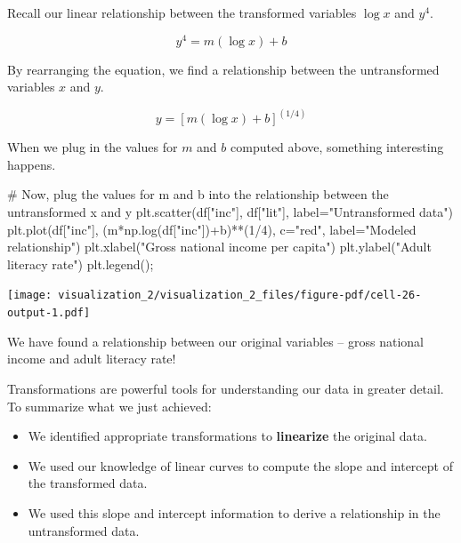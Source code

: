 \documentclass[
  letterpaper,
  DIV=11,
  numbers=noendperiod]{scrreprt}
\newenvironment{Shaded}{\begin{snugshade}}{\end{snugshade}}
\newcommand{\CommentTok}[1]{\textcolor[rgb]{0.37,0.37,0.37}{#1}}
\newcommand{\DecValTok}[1]{\textcolor[rgb]{0.68,0.00,0.00}{#1}}
\newcommand{\NormalTok}[1]{\textcolor[rgb]{0.00,0.23,0.31}{#1}}
\newcommand{\OperatorTok}[1]{\textcolor[rgb]{0.37,0.37,0.37}{#1}}
\newcommand{\StringTok}[1]{\textcolor[rgb]{0.13,0.47,0.30}{#1}}
\providecommand{\tightlist}{%
  \setlength{\itemsep}{0pt}\setlength{\parskip}{0pt}}\usepackage{longtable,booktabs,array}
\begin{document}
Recall our linear relationship between the transformed variables
\(\log{x}\) and \(y^4\).

\[y^4 = m(\log{x}) + b\]

By rearranging the equation, we find a relationship between the
untransformed variables \(x\) and \(y\).

\[y = [m(\log{x}) + b]^{(1/4)}\]

When we plug in the values for \(m\) and \(b\) computed above, something
interesting happens.

\begin{Shaded}
\begin{Highlighting}[]
\CommentTok{\# Now, plug the values for m and b into the relationship between the untransformed x and y}
\NormalTok{plt.scatter(df[}\StringTok{"inc"}\NormalTok{], df[}\StringTok{"lit"}\NormalTok{], label}\OperatorTok{=}\StringTok{"Untransformed data"}\NormalTok{)}
\NormalTok{plt.plot(df[}\StringTok{"inc"}\NormalTok{], (m}\OperatorTok{*}\NormalTok{np.log(df[}\StringTok{"inc"}\NormalTok{])}\OperatorTok{+}\NormalTok{b)}\OperatorTok{**}\NormalTok{(}\DecValTok{1}\OperatorTok{/}\DecValTok{4}\NormalTok{), c}\OperatorTok{=}\StringTok{"red"}\NormalTok{, label}\OperatorTok{=}\StringTok{"Modeled relationship"}\NormalTok{)}
\NormalTok{plt.xlabel(}\StringTok{"Gross national income per capita"}\NormalTok{)}
\NormalTok{plt.ylabel(}\StringTok{"Adult literacy rate"}\NormalTok{)}
\NormalTok{plt.legend()}\OperatorTok{;}
\end{Highlighting}
\end{Shaded}

\texttt{[image: visualization\_2/visualization\_2\_files/figure-pdf/cell-26-output-1.pdf]}

We have found a relationship between our original variables -- gross
national income and adult literacy rate!

Transformations are powerful tools for understanding our data in greater
detail. To summarize what we just achieved:

\begin{itemize}
\tightlist
\item
  We identified appropriate transformations to \textbf{linearize} the
  original data.
\item
  We used our knowledge of linear curves to compute the slope and
  intercept of the transformed data.
\item
  We used this slope and intercept information to derive a relationship
  in the untransformed data.
\end{itemize}
\end{document}
